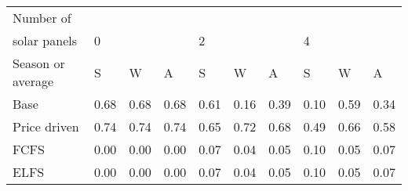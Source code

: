 \begin{table}[h] 
\centering 
\begin{tabular}{l|lll|lll|lll}Number of \\ solar panels&0& & &2& & &4& & \\ \hline 
Season or average & S & W & A & S & W & A & S & W & A \\ \hline 
Base&0.68&0.68&0.68&0.61&0.16&0.39&0.10&0.59&0.34 \\ 
Price driven&0.74&0.74&0.74&0.65&0.72&0.68&0.49&0.66&0.58 \\ 
FCFS&0.00&0.00&0.00&0.07&0.04&0.05&0.10&0.05&0.07 \\ 
ELFS&0.00&0.00&0.00&0.07&0.04&0.05&0.10&0.05&0.07 \\ 
\end{tabular} 
\end{table}